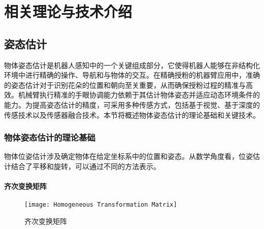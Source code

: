 \chapter{相关理论与技术介绍}\label{ch:2}
\section{姿态估计}

物体姿态估计是机器人感知中的一个关键组成部分，它使得机器人能够在非结构化环境中进行精确的操作、导航和与物体的交互。在精确授粉的机器臂应用中，准确的姿态估计对于识别花朵的位置和朝向至关重要，从而确保授粉过程的精准与高效。机械臂执行精准的手眼协调能力依赖于其估计物体姿态并适应动态环境条件的能力。为提高姿态估计的精度，可采用多种传感方式，包括基于视觉、基于深度的传感技术以及传感器融合技术。本节将概述物体姿态估计的理论基础和关键技术。

\subsection{物体姿态估计的理论基础}




物体位姿估计涉及确定物体在给定坐标系中的位置和姿态。从数学角度看，位姿估计结合了平移和旋转，可以通过不同的方法表示。
 
 \subsubsection{齐次变换矩阵}
 \FloatBarrier
 \begin{figure}[htb]
 	\texttt{[image: Homogeneous Transformation Matrix]}
 	\caption[齐次变换矩阵]{齐次变换矩阵} %
 	\label{fig:Homogeneous Transformation Matrix}
 \end{figure}
 
